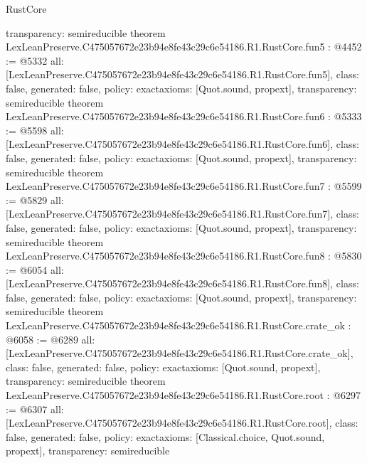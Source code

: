 \begin{lexlean}{RustCore}
\begin{coremodule}
{  transparency: semireducible
}
theorem LexLeanPreserve.C475057672e23b94e8fe43c29c6e54186.R1.RustCore.fun5 : @4452 := @5332 {
  all: [LexLeanPreserve.C475057672e23b94e8fe43c29c6e54186.R1.RustCore.fun5],
  class: false,
  generated: false,
  policy: exact{axioms: [Quot.sound, propext]},
  transparency: semireducible
}
theorem LexLeanPreserve.C475057672e23b94e8fe43c29c6e54186.R1.RustCore.fun6 : @5333 := @5598 {
  all: [LexLeanPreserve.C475057672e23b94e8fe43c29c6e54186.R1.RustCore.fun6],
  class: false,
  generated: false,
  policy: exact{axioms: [Quot.sound, propext]},
  transparency: semireducible
}
theorem LexLeanPreserve.C475057672e23b94e8fe43c29c6e54186.R1.RustCore.fun7 : @5599 := @5829 {
  all: [LexLeanPreserve.C475057672e23b94e8fe43c29c6e54186.R1.RustCore.fun7],
  class: false,
  generated: false,
  policy: exact{axioms: [Quot.sound, propext]},
  transparency: semireducible
}
theorem LexLeanPreserve.C475057672e23b94e8fe43c29c6e54186.R1.RustCore.fun8 : @5830 := @6054 {
  all: [LexLeanPreserve.C475057672e23b94e8fe43c29c6e54186.R1.RustCore.fun8],
  class: false,
  generated: false,
  policy: exact{axioms: [Quot.sound, propext]},
  transparency: semireducible
}
theorem LexLeanPreserve.C475057672e23b94e8fe43c29c6e54186.R1.RustCore.crate_ok : @6058 := @6289 {
  all: [LexLeanPreserve.C475057672e23b94e8fe43c29c6e54186.R1.RustCore.crate_ok],
  class: false,
  generated: false,
  policy: exact{axioms: [Quot.sound, propext]},
  transparency: semireducible
}
theorem LexLeanPreserve.C475057672e23b94e8fe43c29c6e54186.R1.RustCore.root : @6297 := @6307 {
  all: [LexLeanPreserve.C475057672e23b94e8fe43c29c6e54186.R1.RustCore.root],
  class: false,
  generated: false,
  policy: exact{axioms: [Classical.choice, Quot.sound, propext]},
  transparency: semireducible
}


\end{coremodule}
\end{lexlean}
